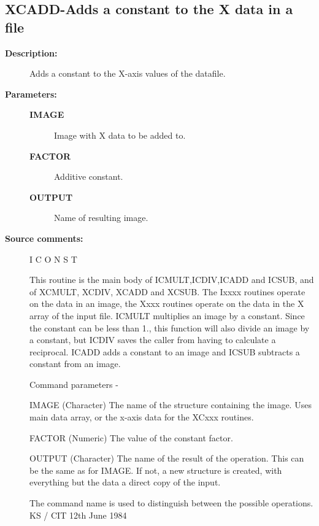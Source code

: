 \subsection{XCADD-\label{XCADD}Adds a constant to the X data in a file}
\begin{description}

\item [\textbf{Description:}]
 Adds a constant to the X-axis values of the datafile.

\item [\textbf{Parameters:}]
\begin{description}
\item [\textbf{IMAGE}]
 Image with X data to be added to.
\item [\textbf{FACTOR}]
 Additive constant.
\item [\textbf{OUTPUT}]
 Name of resulting image.
\end{description}

\item [\textbf{Source comments:}]
\begin{terminalv}
 I C O N S T

 This routine is the main body of ICMULT,ICDIV,ICADD and ICSUB,
 and of XCMULT, XCDIV, XCADD and XCSUB.  The Ixxxx routines
 operate on the data in an image, the Xxxx routines operate on
 the data in the X array of the input file.
 ICMULT multiplies an image by a constant.  Since the constant
 can be less than 1., this function will also divide an
 image by a constant, but ICDIV saves the caller from having
 to calculate a reciprocal. ICADD adds a constant to an image and
 ICSUB subtracts a constant from an image.

 Command parameters -

 IMAGE  (Character) The name of the structure containing the image.
        Uses main data array, or the x-axis data for the XCxxx routines.

 FACTOR (Numeric) The value of the constant factor.

 OUTPUT (Character) The name of the result of the operation.  This
        can be the same as for IMAGE.  If not, a new structure
        is created, with everything but the data a direct
        copy of the input.

 The command name is used to distinguish between the
 possible operations.
                                  KS / CIT 12th June 1984
\end{terminalv}
\end{description}
